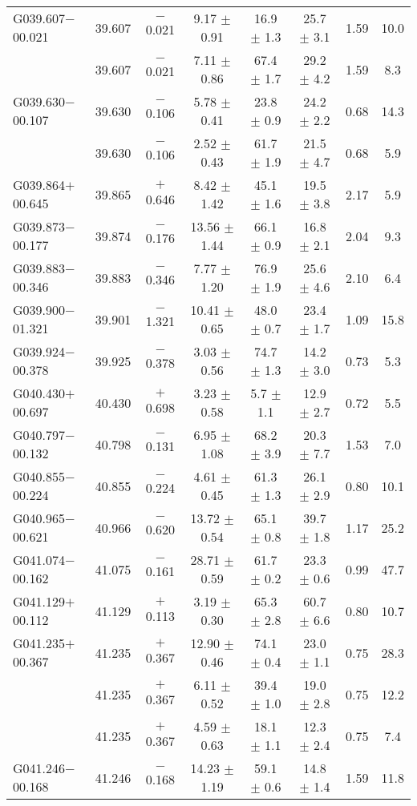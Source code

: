 \begin{ThreePartTable}
\begin{longtable}{lccccccc}
G039.607$-$00.021     &39.607&	$-$0.021	&9.17	$\pm$ 0.91	&16.9	$\pm$ 1.3	&25.7	$\pm$ 3.1	&1.59	&10.0\\
                      &39.607&	$-$0.021	&7.11	$\pm$ 0.86	&67.4	$\pm$ 1.7	&29.2	$\pm$ 4.2	&1.59	&8.3\\
G039.630$-$00.107     &39.630&	$-$0.106	&5.78	$\pm$ 0.41	&23.8	$\pm$ 0.9	&24.2	$\pm$ 2.2	&0.68	&14.3\\
                      &39.630&	$-$0.106	&2.52	$\pm$ 0.43	&61.7	$\pm$ 1.9	&21.5	$\pm$ 4.7	&0.68	&5.9\\
G039.864$+$00.645     &39.865&	$+$0.646	&8.42	$\pm$ 1.42	&45.1	$\pm$ 1.6	&19.5	$\pm$ 3.8	&2.17	&5.9\\
G039.873$-$00.177     &39.874&	$-$0.176	&13.56	$\pm$ 1.44	&66.1	$\pm$ 0.9	&16.8	$\pm$ 2.1	&2.04	&9.3\\
G039.883$-$00.346     &39.883&	$-$0.346	&7.77	$\pm$ 1.20	&76.9	$\pm$ 1.9	&25.6	$\pm$ 4.6	&2.10	&6.4\\
G039.900$-$01.321     &39.901&	$-$1.321	&10.41	$\pm$ 0.65	&48.0	$\pm$ 0.7	&23.4	$\pm$ 1.7	&1.09	&15.8\\
G039.924$-$00.378     &39.925&	$-$0.378	&3.03	$\pm$ 0.56	&74.7	$\pm$ 1.3	&14.2	$\pm$ 3.0	&0.73	&5.3\\
G040.430$+$00.697     &40.430&	$+$0.698	&3.23	$\pm$ 0.58	&5.7	$\pm$ 1.1	&12.9	$\pm$ 2.7	&0.72	&5.5\\
G040.797$-$00.132     &40.798&	$-$0.131	&6.95	$\pm$ 1.08	&68.2	$\pm$ 3.9	&20.3	$\pm$ 7.7	&1.53	&7.0\\
G040.855$-$00.224     &40.855&	$-$0.224	&4.61	$\pm$ 0.45	&61.3	$\pm$ 1.3	&26.1	$\pm$ 2.9	&0.80	&10.1\\
G040.965$-$00.621     &40.966&	$-$0.620	&13.72	$\pm$ 0.54	&65.1	$\pm$ 0.8	&39.7	$\pm$ 1.8	&1.17	&25.2\\
G041.074$-$00.162     &41.075&	$-$0.161	&28.71	$\pm$ 0.59	&61.7	$\pm$ 0.2	&23.3	$\pm$ 0.6	&0.99	&47.7\\
G041.129$+$00.112     &41.129&	$+$0.113	&3.19	$\pm$ 0.30	&65.3	$\pm$ 2.8	&60.7	$\pm$ 6.6	&0.80	&10.7\\
G041.235$+$00.367     &41.235&	$+$0.367	&12.90	$\pm$ 0.46	&74.1	$\pm$ 0.4	&23.0	$\pm$ 1.1	&0.75	&28.3\\
                      &41.235&	$+$0.367	&6.11	$\pm$ 0.52	&39.4	$\pm$ 1.0	&19.0	$\pm$ 2.8	&0.75	&12.2\\
                      &41.235&	$+$0.367	&4.59	$\pm$ 0.63	&18.1	$\pm$ 1.1	&12.3	$\pm$ 2.4	&0.75	&7.4\\
G041.246$-$00.168     &41.246&	$-$0.168	&14.23	$\pm$ 1.19	&59.1	$\pm$ 0.6	&14.8	$\pm$ 1.4	&1.59	&11.8\\

\end{longtable}
\end{ThreePartTable}
